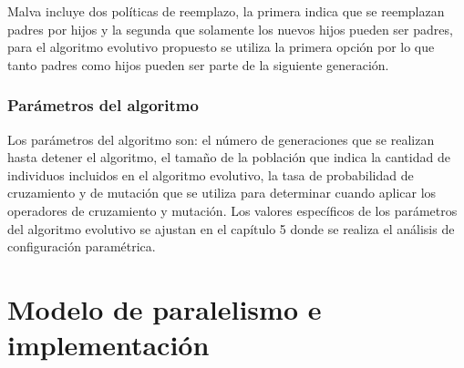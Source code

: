 Malva incluye dos políticas de reemplazo, la primera indica que se reemplazan padres por hijos y la segunda que solamente los nuevos hijos pueden ser padres, para el algoritmo evolutivo propuesto se utiliza la primera opción por lo que tanto padres como hijos pueden ser parte de la siguiente generación.

\subsubsection{Parámetros del algoritmo}
Los parámetros del algoritmo son: el número de generaciones que se realizan hasta detener el algoritmo, el tamaño de la población que indica la cantidad de individuos incluidos en el algoritmo evolutivo, la tasa de probabilidad de cruzamiento y de mutación que se utiliza para determinar cuando aplicar los operadores de cruzamiento y mutación. Los valores específicos de los parámetros del algoritmo evolutivo se ajustan en el capítulo 5 donde se realiza el análisis de configuración paramétrica. 

\section{Modelo de paralelismo e implementación}





